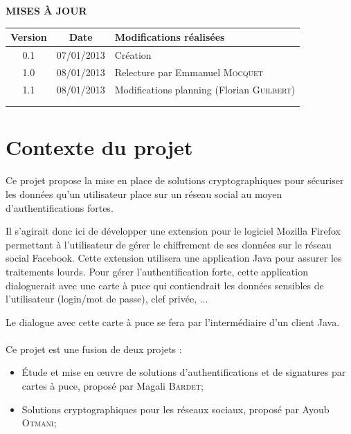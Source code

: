 \documentclass[a4paper,11pt,french]{article}
\begin{document}
\makeFirstPage
\clearpage

\vspace*{1cm}
\begin{center}
\textbf{\huge{MISES À JOUR}}\\
\vspace*{3cm}
	\begin{tabularx}{16cm}{|c|c|X|}
	\hline
	\bfseries{Version} & \bfseries{Date} & \bfseries{Modifications réalisées}\\
	\hline
	0.1 & 07/01/2013 & Création\\
	\hline
	1.0 & 08/01/2013 & Relecture par Emmanuel \textsc{Mocquet}\\
	\hline
	1.1 & 08/01/2013 & Modifications planning (Florian \textsc{Guilbert})\\
	\hline
	&&\\
	\hline
	&&\\
	\hline
	\end{tabularx}
\end{center}

\clearpage
\tableofcontents
\clearpage

\section{Contexte du projet}
Ce projet propose la mise en place de solutions cryptographiques pour sécuriser
les données qu'un utilisateur place sur un réseau social au moyen  
d'authentifications fortes.

Il s'agirait donc ici de développer une extension pour le logiciel
Mozilla Firefox permettant à l'utilisateur de gérer le chiffrement de 
ses données sur le réseau social Facebook. Cette extension utilisera une 
application Java pour assurer les traitements lourds. Pour gérer 
l'authentification forte, cette application dialoguerait avec une carte à 
puce qui contiendrait les données sensibles de l'utilisateur 
(login/mot de passe), clef privée, ...

Le dialogue avec cette carte à puce se fera par l'intermédiaire d'un
client Java.

\paragraph{}
Ce projet est une fusion de deux projets :
\begin{itemize}
    \item Étude et mise en \oe{}uvre de solutions d'authentifications 
    et de signatures par cartes à puce, proposé par Magali \textsc{Bardet};
    \item Solutions cryptographiques pour les réseaux sociaux, 
    proposé par Ayoub \textsc{Otmani};
\end{itemize}
\end{document}
